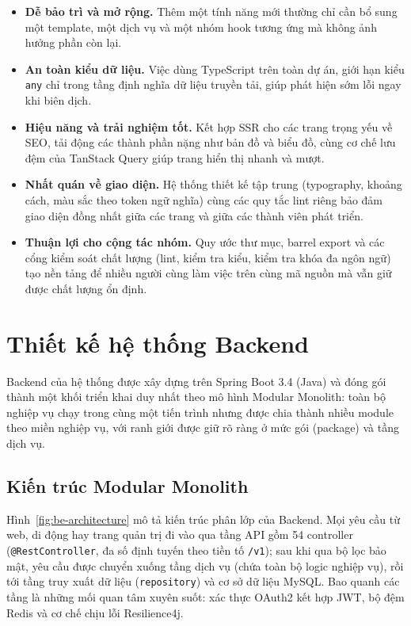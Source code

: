 \begin{itemize}
\item \textbf{Dễ bảo trì và mở rộng.} Thêm một tính năng mới thường chỉ cần bổ sung một template, một dịch vụ và một nhóm hook tương ứng mà không ảnh hưởng phần còn lại.
\item \textbf{An toàn kiểu dữ liệu.} Việc dùng TypeScript trên toàn dự án, giới hạn kiểu \texttt{any} chỉ trong tầng định nghĩa dữ liệu truyền tải, giúp phát hiện sớm lỗi ngay khi biên dịch.
\item \textbf{Hiệu năng và trải nghiệm tốt.} Kết hợp SSR cho các trang trọng yếu về SEO, tải động các thành phần nặng như bản đồ và biểu đồ, cùng cơ chế lưu đệm của TanStack Query giúp trang hiển thị nhanh và mượt.
\item \textbf{Nhất quán về giao diện.} Hệ thống thiết kế tập trung (typography, khoảng cách, màu sắc theo token ngữ nghĩa) cùng các quy tắc lint riêng bảo đảm giao diện đồng nhất giữa các trang và giữa các thành viên phát triển.
\item \textbf{Thuận lợi cho cộng tác nhóm.} Quy ước thư mục, barrel export và các cổng kiểm soát chất lượng (lint, kiểm tra kiểu, kiểm tra khóa đa ngôn ngữ) tạo nền tảng để nhiều người cùng làm việc trên cùng mã nguồn mà vẫn giữ được chất lượng ổn định.
\end{itemize}

\section{Thiết kế hệ thống Backend}
\label{sec:backend-design}

Backend của hệ thống được xây dựng trên Spring Boot 3.4 (Java) và đóng gói thành một khối triển khai duy nhất theo mô hình Modular Monolith: toàn bộ nghiệp vụ chạy trong cùng một tiến trình nhưng được chia thành nhiều module theo miền nghiệp vụ, với ranh giới được giữ rõ ràng ở mức gói (package) và tầng dịch vụ.

\FloatBarrier
\subsection{Kiến trúc Modular Monolith}

Hình~\ref{fig:be-architecture} mô tả kiến trúc phân lớp của Backend. Mọi yêu cầu từ web, di động hay trang quản trị đi vào qua tầng API gồm 54 controller (\texttt{@RestController}, đa số định tuyến theo tiền tố \texttt{/v1}); sau khi qua bộ lọc bảo mật, yêu cầu được chuyển xuống tầng dịch vụ (chứa toàn bộ logic nghiệp vụ), rồi tới tầng truy xuất dữ liệu (\texttt{repository}) và cơ sở dữ liệu MySQL. Bao quanh các tầng là những mối quan tâm xuyên suốt: xác thực OAuth2 kết hợp JWT, bộ đệm Redis và cơ chế chịu lỗi Resilience4j.

